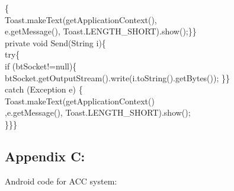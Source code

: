 \documentclass[12pt,a4paper]{report}
\begin{document}
{{{{{{{{{        \{\\
            Toast.makeText(getApplicationContext(),\\
            e.getMessage(), Toast.LENGTH\_SHORT).show();\}\}\\
    private void Send(String i)\{\\
     try\{\\
         if (btSocket!=null)\{\\
             btSocket.getOutputStream().write(i.toString().getBytes());
            \}\}\\
        catch (Exception e)
        \{\\
            Toast.makeText(getApplicationContext()\\
            ,e.getMessage(), Toast.LENGTH\_SHORT).show();\\

        \}\}\}\\
       

\subsection*{Appendix C:}
        
{\large Android code for ACC system:}\\

}}}}}}}}}
\end{document}
